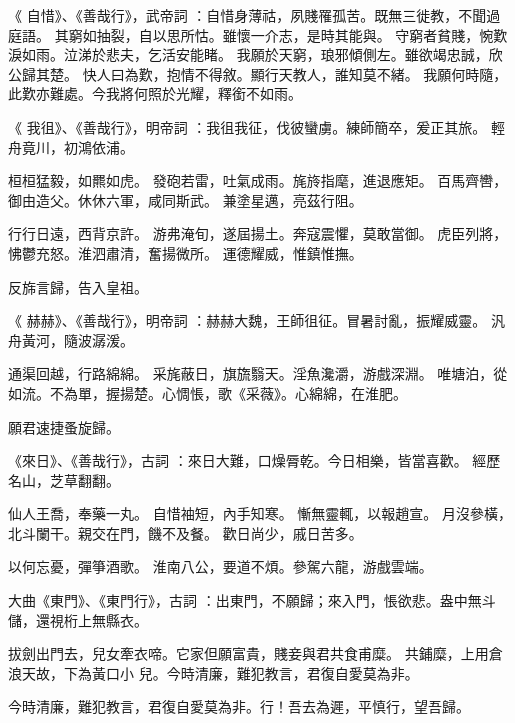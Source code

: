 \begin{pinyinscope}
《
 自惜》、《善哉行》，武帝詞
 ：自惜身薄祜，夙賤罹孤苦。既無三徙教，不聞過庭語。
 其窮如抽裂，自以思所怙。雖懷一介志，是時其能與。
 守窮者貧賤，惋歎淚如雨。泣涕於悲夫，乞活安能睹。
 我願於天窮，琅邪傾側左。雖欲竭忠誠，欣公歸其楚。
 快人曰為歎，抱情不得敘。顯行天教人，誰知莫不緒。
 我願何時隨，此歎亦難處。今我將何照於光耀，釋銜不如雨。


《
 我徂》、《善哉行》，明帝詞
 ：我徂我征，伐彼蠻虜。練師簡卒，爰正其旅。
 輕舟竟川，初鴻依浦。


桓桓猛毅，如羆如虎。
 發砲若雷，吐氣成雨。旄旍指麾，進退應矩。
 百馬齊轡，御由造父。休休六軍，咸同斯武。
 兼塗星邁，亮茲行阻。


行行日遠，西背京許。
 游弗淹旬，遂屆揚土。奔寇震懼，莫敢當御。
 虎臣列將，怫鬱充怒。淮泗肅清，奮揚微所。
 運德耀威，惟鎮惟撫。


反旆言歸，告入皇祖。


《
 赫赫》、《善哉行》，明帝詞
 ：赫赫大魏，王師徂征。冒暑討亂，振耀威靈。
 汎舟黃河，隨波潺湲。


通渠回越，行路綿綿。
 采旄蔽日，旗旒翳天。淫魚瀺灂，游戲深淵。
 唯塘泊，從如流。不為單，握揚楚。心惆悵，歌《采薇》。心綿綿，在淮肥。


願君速捷蚤旋歸。


《來日》、《善哉行》，古詞
 ：來日大難，口燥脣乾。今日相樂，皆當喜歡。
 經歷名山，芝草翻翻。


仙人王喬，奉藥一丸。
 自惜袖短，內手知寒。
 慚無靈輒，以報趙宣。
 月沒參橫，北斗闌干。親交在門，饑不及餐。
 歡日尚少，戚日苦多。


以何忘憂，彈箏酒歌。
 淮南八公，要道不煩。參駕六龍，游戲雲端。


大曲《東門》、《東門行》，古詞
 ：出東門，不願歸；來入門，悵欲悲。盎中無斗儲，還視桁上無縣衣。


拔劍出門去，兒女牽衣啼。它家但願富貴，賤妾與君共食甫糜。
 共鋪糜，上用倉浪天故，下為黃口小
 兒。今時清廉，難犯教言，君復自愛莫為非。


今時清廉，難犯教言，君復自愛莫為非。行！吾去為遲，平慎行，望吾歸。



\end{pinyinscope}
